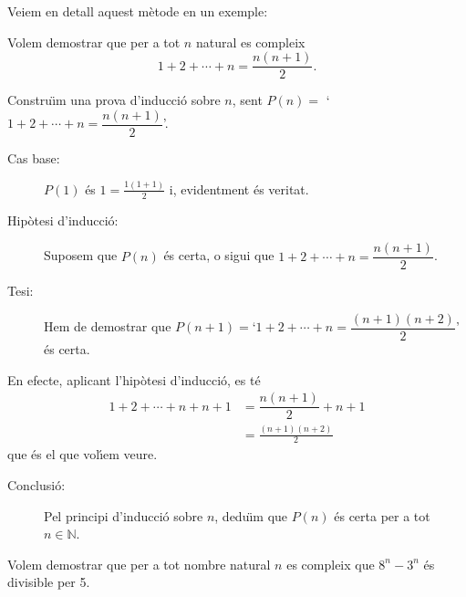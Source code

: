 \bigskip

Veiem en detall aquest m\`{e}tode en un exemple:

\begin{exem}
Volem demostrar que per a tot $n$ natural es compleix%
\begin{equation*}
1+2+\cdots+n=\frac{n(n+1)}{2}\text{.}
\end{equation*}
\end{exem}

\begin{solucio}
Constru\"{\i}m una prova d'inducci\'{o} sobre $n$, sent $P(n)=$ `$1+2+\cdots
+n=\dfrac{n(n+1)}{2}$'.

\begin{description}
\item[Cas base:] $P(1)$ \'{e}s $1=\frac{1(1+1)}{2}$ i, evidentment \'{e}s
veritat.

\item[Hip\`{o}tesi d'inducci\'{o}:] Suposem que $P(n)$ \'{e}s certa, o sigui
que $1+2+\cdots+n=\dfrac{n(n+1)}{2}$.

\item[Tesi:] Hem de demostrar que $P(n+1)=$`$1+2+\cdots+n=\dfrac {(n+1)(n+2)%
}{2}$' \'{e}s certa.
\end{description}

En efecte, aplicant l'hip\`{o}tesi d'inducci\'{o}, es t\'{e}%
\begin{align*}
1+2+\cdots+n+n+1 & =\dfrac{n(n+1)}{2}+n+1 \\
& =\frac{\left( n+1\right) (n+2)}{2}
\end{align*}
que \'{e}s el que vol\'{\i}em veure.

\begin{description}
\item[Conclusi\'{o}:] Pel principi d'inducci\'{o} sobre $n$, dedu\"{\i}m que
$P(n)$ \'{e}s certa per a tot $n\in\mathbb{N}$.
\end{description}
\end{solucio}

\begin{exem}
Volem demostrar que per a tot nombre natural $n$ es compleix que $%
8^{n}-3^{n} $ \'{e}s divisible per 5.
\end{exem}

